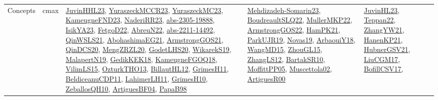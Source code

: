 {\begin{longtable}{lp{3cm}>{\raggedright}p{6cm}>{\raggedright}p{6cm}p{8cm}}
Concepts & cmax & \href{papers/JuvinHHL23.pdf}{JuvinHHL23}\cite{JuvinHHL23}, \href{articles/YuraszeckMCCR23.pdf}{YuraszeckMCCR23}\cite{YuraszeckMCCR23}, \href{papers/YuraszeckMC23.pdf}{YuraszeckMC23}\cite{YuraszeckMC23}, \href{papers/KameugneFND23.pdf}{KameugneFND23}\cite{KameugneFND23}, \href{articles/NaderiRR23.pdf}{NaderiRR23}\cite{NaderiRR23}, \href{articles/abs-2305-19888.pdf}{abs-2305-19888}\cite{abs-2305-19888}, \href{articles/IsikYA23.pdf}{IsikYA23}\cite{IsikYA23}, \href{articles/FetgoD22.pdf}{FetgoD22}\cite{FetgoD22}, \href{articles/AbreuN22.pdf}{AbreuN22}\cite{AbreuN22}, \href{articles/abs-2211-14492.pdf}{abs-2211-14492}\cite{abs-2211-14492}, \href{articles/QinWSLS21.pdf}{QinWSLS21}\cite{QinWSLS21}, \href{articles/AbohashimaEG21.pdf}{AbohashimaEG21}\cite{AbohashimaEG21}, \href{papers/ArmstrongGOS21.pdf}{ArmstrongGOS21}\cite{ArmstrongGOS21}, \href{articles/QinDCS20.pdf}{QinDCS20}\cite{QinDCS20}, \href{articles/MengZRZL20.pdf}{MengZRZL20}\cite{MengZRZL20}, \href{papers/GodetLHS20.pdf}{GodetLHS20}\cite{GodetLHS20}, \href{articles/WikarekS19.pdf}{WikarekS19}\cite{WikarekS19}, \href{papers/MalapertN19.pdf}{MalapertN19}\cite{MalapertN19}, \href{articles/GedikKEK18.pdf}{GedikKEK18}\cite{GedikKEK18}, \href{papers/KameugneFGOQ18.pdf}{KameugneFGOQ18}\cite{KameugneFGOQ18}, \href{papers/VilimLS15.pdf}{VilimLS15}\cite{VilimLS15}, \href{articles/OzturkTHO13.pdf}{OzturkTHO13}\cite{OzturkTHO13}, \href{papers/BillautHL12.pdf}{BillautHL12}\cite{BillautHL12}, \href{papers/GrimesH11.pdf}{GrimesH11}\cite{GrimesH11}, \href{articles/BeldiceanuCDP11.pdf}{BeldiceanuCDP11}\cite{BeldiceanuCDP11}, \href{papers/LahimerLH11.pdf}{LahimerLH11}\cite{LahimerLH11}, \href{papers/GrimesH10.pdf}{GrimesH10}\cite{GrimesH10}, \href{articles/ZeballosQH10.pdf}{ZeballosQH10}\cite{ZeballosQH10}, \href{papers/ArtiguesBF04.pdf}{ArtiguesBF04}\cite{ArtiguesBF04}, \href{articles/PapaB98.pdf}{PapaB98}\cite{PapaB98} & \href{papers/Mehdizadeh-Somarin23.pdf}{Mehdizadeh-Somarin23}\cite{Mehdizadeh-Somarin23}, \href{papers/BoudreaultSLQ22.pdf}{BoudreaultSLQ22}\cite{BoudreaultSLQ22}, \href{articles/MullerMKP22.pdf}{MullerMKP22}\cite{MullerMKP22}, \href{papers/ArmstrongGOS22.pdf}{ArmstrongGOS22}\cite{ArmstrongGOS22}, \href{articles/HamPK21.pdf}{HamPK21}\cite{HamPK21}, \href{papers/ParkUJR19.pdf}{ParkUJR19}\cite{ParkUJR19}, \href{articles/Novas19.pdf}{Novas19}\cite{Novas19}, \href{papers/ArbaouiY18.pdf}{ArbaouiY18}\cite{ArbaouiY18}, \href{articles/WangMD15.pdf}{WangMD15}\cite{WangMD15}, \href{papers/ZhouGL15.pdf}{ZhouGL15}\cite{ZhouGL15}, \href{papers/ZhangLS12.pdf}{ZhangLS12}\cite{ZhangLS12}, \href{articles/BartakSR10.pdf}{BartakSR10}\cite{BartakSR10}, \href{papers/MoffittPP05.pdf}{MoffittPP05}\cite{MoffittPP05}, \href{papers/Muscettola02.pdf}{Muscettola02}\cite{Muscettola02}, \href{articles/ArtiguesR00.pdf}{ArtiguesR00}\cite{ArtiguesR00} & \href{papers/JuvinHL23.pdf}{JuvinHL23}\cite{JuvinHL23}, \href{papers/Teppan22.pdf}{Teppan22}\cite{Teppan22}, \href{articles/ZhangYW21.pdf}{ZhangYW21}\cite{ZhangYW21}, \href{papers/HanenKP21.pdf}{HanenKP21}\cite{HanenKP21}, \href{articles/HubnerGSV21.pdf}{HubnerGSV21}\cite{HubnerGSV21}, \href{papers/LiuCGM17.pdf}{LiuCGM17}\cite{LiuCGM17}, \href{papers/BofillCSV17.pdf}{BofillCSV17}\cite{BofillCSV17}, 
\end{longtable}}
